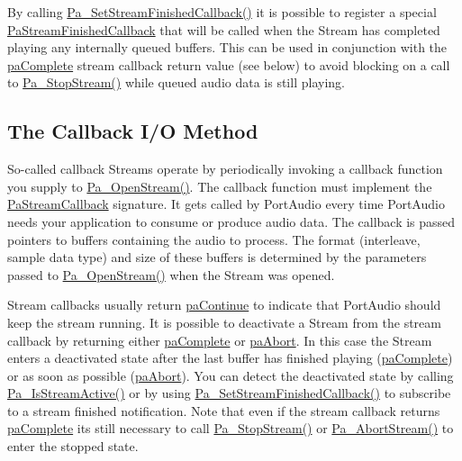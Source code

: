 By calling \hyperlink{portaudio_8h_aa11e7b06b2cde8621551f5d527965838}{Pa\+\_\+\+Set\+Stream\+Finished\+Callback()} it is possible to register a special \hyperlink{portaudio_8h_ab2530ee0cb756c67726f9074d3482ef2}{Pa\+Stream\+Finished\+Callback} that will be called when the Stream has completed playing any internally queued buffers. This can be used in conjunction with the \hyperlink{portaudio_8h_ae9bfb9c4e1895326f30f80d415c66c32aa01800db52ead393d8b0016f63d76650}{pa\+Complete} stream callback return value (see below) to avoid blocking on a call to \hyperlink{portaudio_8h_af18dd60220251286c337631a855e38a0}{Pa\+\_\+\+Stop\+Stream()} while queued audio data is still playing.\hypertarget{api_overview_callback_io_method}{}\subsection{The Callback I/\+O Method}\label{api_overview_callback_io_method}
So-\/called \textquotesingle{}callback Streams\textquotesingle{} operate by periodically invoking a callback function you supply to \hyperlink{portaudio_8h_a443ad16338191af364e3be988014cbbe}{Pa\+\_\+\+Open\+Stream()}. The callback function must implement the \hyperlink{portaudio_8h_a8a60fb2a5ec9cbade3f54a9c978e2710}{Pa\+Stream\+Callback} signature. It gets called by Port\+Audio every time Port\+Audio needs your application to consume or produce audio data. The callback is passed pointers to buffers containing the audio to process. The format (interleave, sample data type) and size of these buffers is determined by the parameters passed to \hyperlink{portaudio_8h_a443ad16338191af364e3be988014cbbe}{Pa\+\_\+\+Open\+Stream()} when the Stream was opened.

Stream callbacks usually return \hyperlink{portaudio_8h_ae9bfb9c4e1895326f30f80d415c66c32acba49cbf0e3bf605bb3deecef3b4fce3}{pa\+Continue} to indicate that Port\+Audio should keep the stream running. It is possible to deactivate a Stream from the stream callback by returning either \hyperlink{portaudio_8h_ae9bfb9c4e1895326f30f80d415c66c32aa01800db52ead393d8b0016f63d76650}{pa\+Complete} or \hyperlink{portaudio_8h_ae9bfb9c4e1895326f30f80d415c66c32acaf141eb5d71420ffb4474da1dbd8de2}{pa\+Abort}. In this case the Stream enters a deactivated state after the last buffer has finished playing (\hyperlink{portaudio_8h_ae9bfb9c4e1895326f30f80d415c66c32aa01800db52ead393d8b0016f63d76650}{pa\+Complete}) or as soon as possible (\hyperlink{portaudio_8h_ae9bfb9c4e1895326f30f80d415c66c32acaf141eb5d71420ffb4474da1dbd8de2}{pa\+Abort}). You can detect the deactivated state by calling \hyperlink{portaudio_8h_a1f8709c4971932643681a6f374c4bb5a}{Pa\+\_\+\+Is\+Stream\+Active()} or by using \hyperlink{portaudio_8h_aa11e7b06b2cde8621551f5d527965838}{Pa\+\_\+\+Set\+Stream\+Finished\+Callback()} to subscribe to a stream finished notification. Note that even if the stream callback returns \hyperlink{portaudio_8h_ae9bfb9c4e1895326f30f80d415c66c32aa01800db52ead393d8b0016f63d76650}{pa\+Complete} it\textquotesingle{}s still necessary to call \hyperlink{portaudio_8h_af18dd60220251286c337631a855e38a0}{Pa\+\_\+\+Stop\+Stream()} or \hyperlink{portaudio_8h_a138e57abde4e833c457b64895f638a25}{Pa\+\_\+\+Abort\+Stream()} to enter the stopped state.

